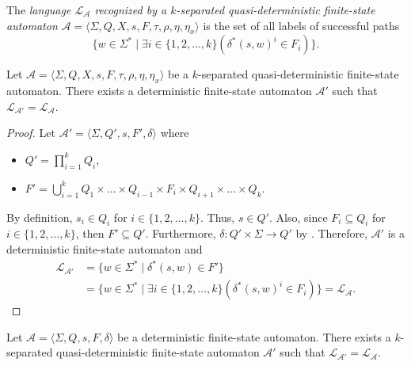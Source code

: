 \begin{definition}
  The \emph{language $\mathcal{L}_\mathcal{A}$ recognized by a $k$-separated
  quasi-deterministic finite-state automaton} $\mathcal{A} = \langle \Sigma, Q, X, s,
  F, \tau, \rho, \eta, \eta_x \rangle$ is the set of all labels of successful paths
  \begin{equation*}
    \{ w \in \Sigma^* \mid \exists i \in \{ 1, 2, \ldots, k \}(\delta^*(s, w)^i \in
    F_i) \}.
  \end{equation*}
\end{definition}

\begin{lemma}\label{lem:quasidet_equiv_left}
  Let $\mathcal{A} = \langle \Sigma, Q, X, s, F, \tau, \rho, \eta, \eta_x \rangle$ be
  a $k$-separated quasi-deterministic finite-state automaton. There exists a
  deterministic finite-state automaton $\mathcal{A}'$ such that
  $\mathcal{L}_\mathcal{A'} = \mathcal{L}_\mathcal{A}$.
\end{lemma}

\begin{proof}
  Let $\mathcal{A}' = \langle \Sigma, Q', s, F', \delta \rangle$ where
  \begin{itemize}
    \item $Q' = \prod_{i=1}^k Q_i$,
    \item $F' = \bigcup_{i=1}^k Q_1 \times \ldots \times Q_{i-1} \times F_i \times
      Q_{i+1} \times \ldots \times Q_k$.
  \end{itemize}
  By definition, $s_i \in Q_i$ for $i \in \{ 1, 2, \ldots, k \}$. Thus, $s \in Q'$.
  Also, since $F_i \subseteq Q_i$ for $i \in \{ 1, 2, \ldots, k \}$, then $F'
  \subseteq Q'$. Furthermore, $\delta : Q' \times \Sigma \rightarrow Q'$ by
  . Therefore, $\mathcal{A}'$ is a deterministic
  finite-state automaton and
  \begin{align*}
    \mathcal{L}_\mathcal{A'} &= \{ w \in \Sigma^* \mid \delta^*(s, w) \in F' \}\\
    &= \{ w \in \Sigma^* \mid \exists i \in \{ 1, 2, \ldots, k \} (\delta^*(s, w)^i
    \in F_i) \} = \mathcal{L}_\mathcal{A}.
  \end{align*}
\end{proof}

\begin{lemma}\label{lem:quasidet_equiv_right}
  Let $\mathcal{A} = \langle \Sigma, Q, s, F, \delta \rangle$ be a deterministic
  finite-state automaton. There exists a $k$-separated quasi-deterministic
  finite-state automaton $\mathcal{A}'$ such that $\mathcal{L}_\mathcal{A'} =
  \mathcal{L}_\mathcal{A}$.
\end{lemma}

